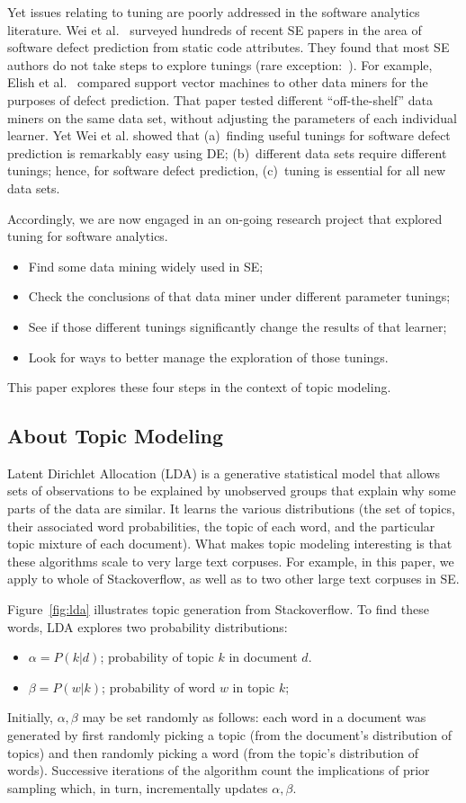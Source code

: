 \documentclass[10pt,conference]{IEEEtran}
\newcommand{\bi}{\begin{itemize}}
\newcommand{\ei}{\end{itemize}}
\theoremstyle{break}
\begin{document}
Yet issues relating to
tuning are poorly addressed in the software analytics literature.  Wei et al.~\cite{fu2016tuning} surveyed hundreds of recent SE papers in the area
of software defect prediction from static code attributes. They found that most SE
  authors do not take steps to explore tunings (rare exception:~\cite{tantithamthavorn2016icse}). For example, Elish et
  al.~\cite{elish2008predicting} compared support vector machines to other data
  miners for the purposes of defect prediction. That paper tested different
  “off-the-shelf” data miners on the same data set, without adjusting the
  parameters of each individual learner.  Yet Wei et al.
  showed that (a)~finding useful tunings for software defect prediction is remarkably
  easy using DE;  (b)~different data sets require
  different tunings; hence, for software defect prediction,  (c)~tuning is essential for  all
  new data sets.


Accordingly,  we are now engaged in an on-going research project that explored tuning for software analytics.
\bi
\item Find some data mining widely used in SE;
\item Check the conclusions of that data miner under different parameter tunings;
\item See if those different tunings significantly change the results of that learner;
\item Look for ways to better manage the exploration of those tunings.  \ei This
  paper explores these four steps in the context of topic modeling. 


  

\subsection{About Topic Modeling}\label{sect:tm}

Latent Dirichlet Allocation (LDA) is a generative statistical model that allows
sets of observations to be explained by unobserved groups that explain why some
parts of the data are similar. It learns the various distributions (the set of
topics, their associated word probabilities, the topic of each word, and the
particular topic mixture of each document).
What makes topic modeling interesting is that these algorithms scale to very
large text corpuses.  For example, in this paper, we apply to whole of Stackoverflow,
as well as to two other large text corpuses in SE.

Figure~\ref{fig:lda} illustrates topic generation from Stackoverflow.
To find these words, LDA explores two probability distributions:
\bi
\item $\alpha=P(k|d)$; probability of topic $k$ in  document $d$.
\item $\beta=P(w|k)$; probability of word $w$ in topic $k$; 
\ei
  Initially, $\alpha,\beta$ may be set randomly as follows:
each word in a document was generated by first randomly picking a topic (from
the document’s distribution of topics) and then randomly picking a word (from
the topic’s distribution of words). Successive iterations of the algorithm 
count the implications of prior sampling which, in turn,  incrementally updates $\alpha,\beta$.
\end{document}
